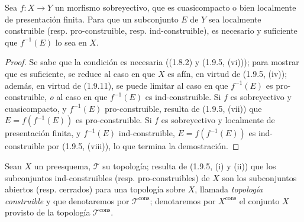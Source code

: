 \begin{corollary}[1.9.12]
\label{IV.1.9.12-fr}
Sea $f:X\to Y$ un morfismo sobreyectivo, que es cuasicompacto o bien
localmente de presentación finita. Para que un subconjunto $E$ de $Y$ sea
localmente construible \textup{(resp.} pro-construible, \textup{resp.} ind-construible\textup{)},
es necesario y suficiente que $f^{-1}(E)$ lo sea en $X$.
\end{corollary}


\begin{proof}
Se sabe que la condición es necesaria ((1.8.2) y (1.9.5, (vi))); para
mostrar que es suficiente, se reduce al caso en que $X$ es afín, en
virtud de (1.9.5, (iv)); además, en virtud de (1.9.11), se puede limitar al
caso en que $f^{-1}(E)$ es pro-construible, \emph{o} al caso en que $f^{-1}(E)$ es
ind-construible. Si $f$ es sobreyectivo y cuasicompacto, y $f^{-1}(E)$
pro-construible, resulta de (1.9.5, (vii)) que
$E=f(f^{-1}(E))$ es pro-construible. Si $f$ es sobreyectivo y localmente de
presentación finita, y $f^{-1}(E)$ ind-construible,
$E=f(f^{-1}(E))$ es ind-construible por (1.9.5, (viii)), lo que termina la
demostración.
\end{proof}

\begin{env}[1.9.13]
\label{IV.1.9.13-fr}
Sean $X$ un preesquema, $\mathscr T$ su topología; resulta de (1.9.5,
(i) y (ii)) que los subconjuntos ind-construibles (resp. pro-construibles) de
$X$ son los subconjuntos abiertos (resp. cerrados) para una topología sobre $X$,
llamada \emph{topología construible} y que denotaremos por
$\mathscr T^{\mathrm{cons}}$; denotaremos por $X^{\mathrm{cons}}$
el conjunto $X$ provisto de la topología $\mathscr T^{\mathrm{cons}}$.
\end{env}

